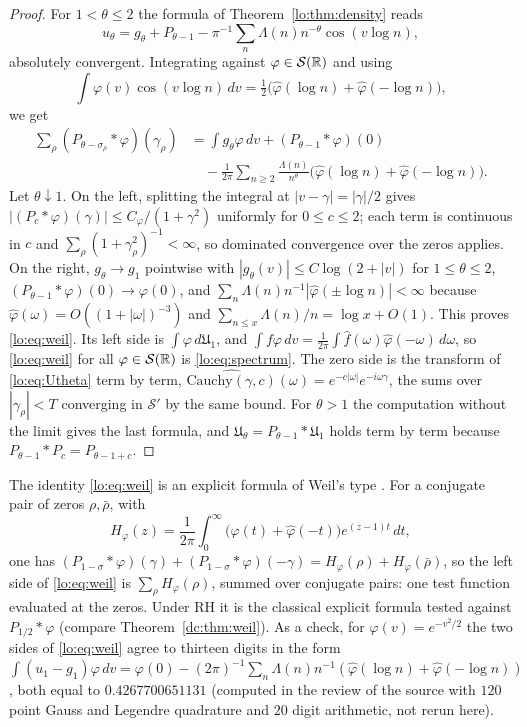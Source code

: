 \begin{proof}
For $1<\theta\le2$ the formula of Theorem~\ref{lo:thm:density} reads
\[
u_\theta=g_\theta+P_{\theta-1}-\pi^{-1}\sum_n\Lambda(n)n^{-\theta}\cos(v\log n),
\]
absolutely convergent. Integrating against $\varphi\in\mathcal S(\mathbb{R})$ and using
\[
\int\varphi(v)\cos(v\log n)\,dv=\tfrac12\bigl(\widehat\varphi(\log n)+\widehat\varphi(-\log n)\bigr),
\]
we get
\[
\begin{split}\sum_\rho(P_{\theta-\sigma_\rho}*\varphi)(\gamma_\rho)&=\int g_\theta\varphi\,dv+(P_{\theta-1}*\varphi)(0)\\&\quad-\frac1{2\pi}\sum_{n\ge2}\frac{\Lambda(n)}{n^\theta}\bigl(\widehat\varphi(\log n)+\widehat\varphi(-\log n)\bigr).\end{split}
\]
Let $\theta\downarrow1$. On the left, splitting the integral at $|v-\gamma|=|\gamma|/2$ gives $|(P_c*\varphi)(\gamma)|\le C_\varphi/(1+\gamma^2)$ uniformly for $0\le c\le2$; each term is continuous in $c$ and $\sum_\rho(1+\gamma_\rho^2)^{-1}<\infty$, so dominated convergence over the zeros applies. On the right, $g_\theta\to g_1$ pointwise with $|g_\theta(v)|\le C\log(2+|v|)$ for $1\le\theta\le2$, $(P_{\theta-1}*\varphi)(0)\to\varphi(0)$, and $\sum_n\Lambda(n)n^{-1}|\widehat\varphi(\pm\log n)|<\infty$ because $\widehat\varphi(\omega)=O((1+|\omega|)^{-3})$ and $\sum_{n\le x}\Lambda(n)/n=\log x+O(1)$. This proves \eqref{lo:eq:weil}. Its left side is $\int\varphi\,d\mathfrak U_1$, and $\int f\varphi\,dv=\frac1{2\pi}\int\widehat f(\omega)\widehat\varphi(-\omega)\,d\omega$, so \eqref{lo:eq:weil} for all $\varphi\in\mathcal S(\mathbb{R})$ is \eqref{lo:eq:spectrum}. The zero side is the transform of \eqref{lo:eq:Utheta} term by term, $\widehat{\mathrm{Cauchy}(\gamma,c)}(\omega)=e^{-c|\omega|}e^{-i\omega\gamma}$, the sums over $|\gamma_\rho|<T$ converging in $\mathcal S'$ by the same bound. For $\theta>1$ the computation without the limit gives the last formula, and $\mathfrak U_\theta=P_{\theta-1}*\mathfrak U_1$ holds term by term because $P_{\theta-1}*P_c=P_{\theta-1+c}$.
\end{proof}

The identity \eqref{lo:eq:weil} is an explicit formula of Weil's type \cite{Weil52}. For a conjugate pair of zeros $\rho,\bar\rho$, with
\[
H_\varphi(z)=\frac1{2\pi}\int_0^\infty\bigl(\widehat\varphi(t)+\widehat\varphi(-t)\bigr)e^{(z-1)t}\,dt ,
\]
one has $(P_{1-\sigma}*\varphi)(\gamma)+(P_{1-\sigma}*\varphi)(-\gamma)=H_\varphi(\rho)+H_\varphi(\bar\rho)$, so the left side of \eqref{lo:eq:weil} is $\sum_\rho H_\varphi(\rho)$, summed over conjugate pairs: one test function evaluated at the zeros. Under RH it is the classical explicit formula tested against $P_{1/2}*\varphi$ (compare Theorem~\ref{dc:thm:weil}). As a check, for $\varphi(v)=e^{-v^2/2}$ the two sides of \eqref{lo:eq:weil} agree to thirteen digits in the form $\int(u_1-g_1)\varphi\,dv=\varphi(0)-(2\pi)^{-1}\sum_n\Lambda(n)n^{-1}(\widehat\varphi(\log n)+\widehat\varphi(-\log n))$, both equal to $0.4267700651131$ (computed in the review of the source with $120$ point Gauss and Legendre quadrature and $20$ digit arithmetic, not rerun here).

